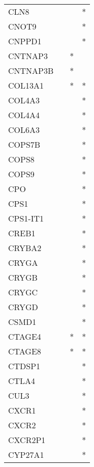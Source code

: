 \begin{longtable}{lccc}
CLN8           &           &     &       * \\
CNOT9          &           &     &       * \\
CNPPD1         &           &     &       * \\
CNTNAP3        &           &   * &         \\
CNTNAP3B       &           &   * &         \\
COL13A1        &           &   * &       * \\
COL4A3         &           &     &       * \\
COL4A4         &           &     &       * \\
COL6A3         &           &     &       * \\
COPS7B         &           &     &       * \\
COPS8          &           &     &       * \\
COPS9          &           &     &       * \\
CPO            &           &     &       * \\
CPS1           &           &     &       * \\
CPS1-IT1       &           &     &       * \\
CREB1          &           &     &       * \\
CRYBA2         &           &     &       * \\
CRYGA          &           &     &       * \\
CRYGB          &           &     &       * \\
CRYGC          &           &     &       * \\
CRYGD          &           &     &       * \\
CSMD1          &           &     &       * \\
CTAGE4         &           &   * &       * \\
CTAGE8         &           &   * &       * \\
CTDSP1         &           &     &       * \\
CTLA4          &           &     &       * \\
CUL3           &           &     &       * \\
CXCR1          &           &     &       * \\
CXCR2          &           &     &       * \\
CXCR2P1        &           &     &       * \\
CYP27A1        &           &     &       * \\

\end{longtable}
